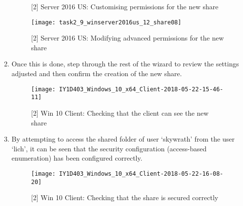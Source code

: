 \begin{enumerate}[series=task2methodology5]
\begin{figure}[H]
      \caption{[2] Server 2016 US: Customising permissions for the new share}
      \label{fig:task2:vspherec_ussf07}
    \end{figure}
    \begin{figure}[H]
      \centering
      \captionsetup{skip=2pt}
      \texttt{[image: task2\_9\_winserver2016us\_12\_share08]}
      \caption{[2] Server 2016 US: Modifying advanced permissions for the new share}
      \label{fig:task2:vspherec_ussf08}
    \end{figure}
  \item {} Once this is done, step through the rest of the wizard to review the settings adjusted and then confirm the creation of the new share.
    \begin{figure}[H]
      \centering
      \captionsetup{skip=2pt}
      \texttt{[image: IY1D403\_Windows\_10\_x64\_Client-2018-05-22-15-46-11]}
      \caption{[2] Win 10 Client: Checking that the client can see the new share}
      \label{fig:task2:vspherec_ussfx}
    \end{figure}
  \item {} By attempting to access the shared folder of user `skywrath' from the user `lich', it can be seen that the security configuration (access-based enumeration) has been configured correctly.
    \begin{figure}[H]
      \centering
      \captionsetup{skip=2pt}
      \texttt{[image: IY1D403\_Windows\_10\_x64\_Client-2018-05-22-16-08-20]}
      \caption{[2] Win 10 Client: Checking that the share is secured correctly}
      \label{fig:task2:vspherec_ussfx2}
    \end{figure}
\end{enumerate}
